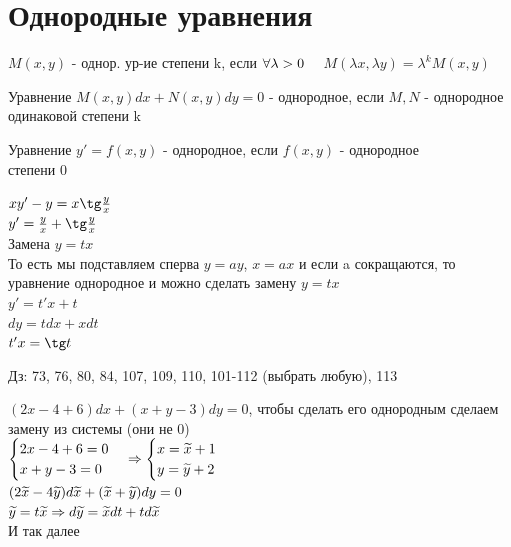 \documentclass[12pt, fleqn]{article}
\begin{document}
\section{Однородные уравнения}
\begin{definition}
    $M(x,y)$ - однор. ур-ие степени k, если $\forall \lambda>0 \quad $ $M(\lambda x, \lambda y) = \lambda^k M(x,y)$
\end{definition}

\begin{definition}
    Уравнение $M(x,y) dx + N(x,y) dy=0$ - однородное, если $M,N$ - однородное одинаковой степени k
\end{definition}

\begin{definition}
    Уравнение $y'=f(x,y)$ - однородное, если $f(x,y)$ - однородное \\ степени 0
\end{definition}

\begin{example}
    $x y'-y=x \tg \frac{y}{x}$\\
    $y'=\frac{y}{x}+\tg \frac{y}{x}$\\
    Замена $y=t x$\\
    То есть мы подставляем сперва $y=ay$, $x=ax$ и если a сокращаются, то уравнение однородное и можно сделать замену $y=tx$\\
    $y'=t' x+t$\\
    $dy=t dx+x dt$\\
    $t' x = \tg t$
\end{example}

Дз: 73, 76, 80, 84, 107, 109, 110, 101-112 (выбрать любую), 113

\begin{example}
    $(2x-4+6)dx+(x+y-3)dy=0$, чтобы сделать его однородным сделаем замену из системы (они не 0)\\
    $\begin{cases} 2x-4+6 = 0 \\ x+y-3=0 \end{cases} \Rightarrow \begin{cases} x=\widetilde{x}+1 \\ y=\widetilde{y}+2 \end{cases}$\\
    $(2\widetilde{x}-4\widetilde{y})d\widetilde{x}+(\widetilde{x}+\widetilde{y})d{y}=0$\\
    $\widetilde{y}=t\widetilde{x} \Rightarrow d\widetilde{y}=\widetilde{x}dt+td\widetilde{x}$\\
    И так далее
\end{example}
\end{document}
